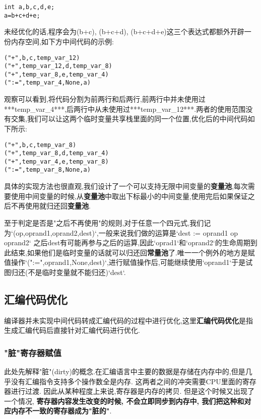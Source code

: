 \documentclass{article}
\begin{document}
\begin{verbatim}
int a,b,c,d,e;
a=b+c+d+e;
\end{verbatim}

未经优化的话,程序会为(b+c), (b+c+d), (b+c+d+e)这三个表达式都额外开辟一份内存空间,如下方中间代码的示例:

\begin{verbatim}
("+",b,c,temp_var_12)
("+",temp_var_12,d,temp_var_8)
("+",temp_var_8,e,temp_var_4)
(":=",temp_var_4,None,a)
\end{verbatim}

观察可以看到,将代码分割为前两行和后两行,前两行中并未使用过***temp\_var\_4***,后两行中从未使用过***temp\_var\_12***.两者的使用范围没有交集,我们可以让这两个临时变量共享栈里面的同一个位置,优化后的中间代码如下所示:

\begin{verbatim}
("+",b,c,temp_var_8)
("+",temp_var_8,d,temp_var_4)
("+",temp_var_4,e,temp_var_8)
(":=",temp_var_8,None,a)
\end{verbatim}

具体的实现方法也很直观,我们设计了一个可以支持无限中间变量的\textbf{变量池},每次需要使用中间变量的时候,从\textbf{变量池}中取出下标最小的中间变量,使用完后如果保证之后不再使用就归还回\textbf{变量池}.


至于判定是否是"之后不再使用"的规则,对于任意一个四元式,我们记为`(op,oprand1,oprand2,dest)`,一般来说我们做的运算是`dest := oprand1 op oprand2` 之后dest有可能再参与之后的运算,因此`oprad1`和`oprand2`的生命周期到此结束,如果他们是临时变量的话就可以归还回\textbf{常量池}了.唯一一个例外的地方是赋值操作`(":=",oprand1,None,dest)`,进行赋值操作后,可能继续使用`oprand1`于是试图归还(不是临时变量就不能归还)`dest`.

\subsection{汇编代码优化}

编译器并未实现中间代码转成汇编代码的过程中进行优化,这里\textbf{汇编代码优化}是指生成汇编代码后直接针对汇编代码进行优化.

\subsubsection{"脏"寄存器赋值}

此处先解释"脏"(dirty)的概念.在汇编语言中主要的数据是存储在内存中的,但是几乎没有汇编指令支持多个操作数全是内存. 这两者之间的冲突需要CPU里面的寄存器进行过渡. 因此从某种程度上来说,寄存器是内存的拷贝. 但是这个时候又出现了一个情况, \textbf{寄存器内容发生改变的时候, 不会立即同步到内存中, 我们把这种和对应内存不一致的寄存器成为"脏的"}.
\end{document}
